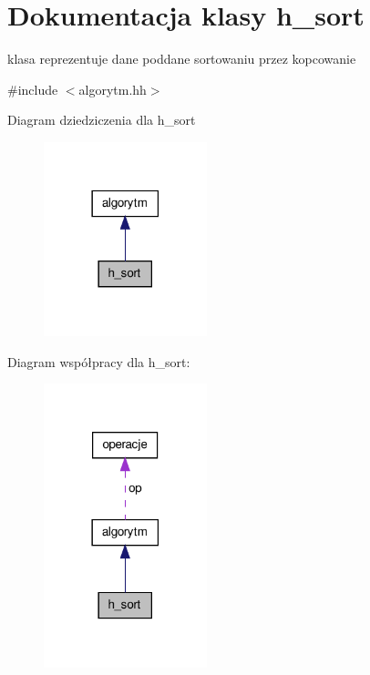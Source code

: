 \hypertarget{classh__sort}{\section{\-Dokumentacja klasy h\-\_\-sort}
\label{classh__sort}
}


klasa reprezentuje dane poddane sortowaniu przez kopcowanie  




{\ttfamily \#include $<$algorytm.\-hh$>$}



\-Diagram dziedziczenia dla h\-\_\-sort
\nopagebreak
\begin{figure}[H]
\begin{center}
\leavevmode
\includegraphics[width=134pt]{classh__sort__inherit__graph}
\end{center}
\end{figure}


\-Diagram współpracy dla h\-\_\-sort\-:
\nopagebreak
\begin{figure}[H]
\begin{center}
\leavevmode
\includegraphics[width=134pt]{classh__sort__coll__graph}
\end{center}
\end{figure}
